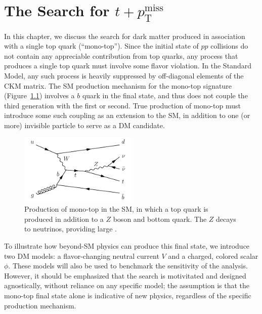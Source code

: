 \boldmath
\chapter{The Search for ${t+p_\text{T}^\text{miss}}$}
\unboldmath
\label{sec:mt}

In this chapter, we discuss the search for dark matter produced in association with a single top quark (``mono-top'').
Since the initial state of $pp$ collisions do not contain any appreciable contribution from top quarks, any process that produces a single top quark must involve some flavor violation.
In the Standard Model, any such process is heavily suppressed by off-diagonal elements of the CKM matrix.
The SM production mechanism for the mono-top signature (Figure~\ref{fig:mt:tzq}) involves a $b$ quark in the final state, and thus does not couple the third generation with the first or second.
True production of mono-top must introduce some such coupling as an extension to the SM, in addition to one (or more) invisible particle to serve as a DM candidate.

\begin{figure}[]
    \begin{center}
        \includegraphics[width=0.5\textwidth]{figures/monotop/diagrams/tzq.pdf}
        \caption{Production of mono-top in the SM, in which a top quark is produced in addition to a $Z$ boson and bottom quark. The $Z$ decays to neutrinos, providing large \ptmiss.}
        \label{fig:mt:tzq}
    \end{center}
\end{figure}

To illustrate how beyond-SM physics can produce this final state, we introduce two DM models: a flavor-changing neutral current $V$ and a charged, colored scalar $\phi$.
These models will also be used to benchmark the sensitivity of the analysis.
However, it should be emphasized that the search is motivitated and designed agnostically, without reliance on any specific model; the assumption is that the mono-top final state alone is indicative of new physics, regardless of the specific production mechanism.

